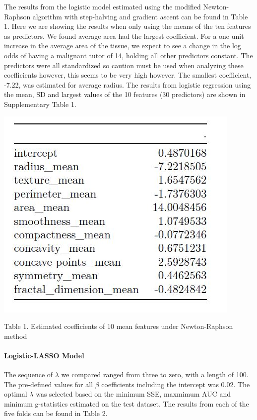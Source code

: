 \documentclass[]{article}
\let\oldparagraph\paragraph
\renewcommand{\paragraph}[1]{\oldparagraph{#1}\mbox{}}
\begin{document}
The results from the logistic model estimated using the modified
Newton-Raphson algorithm with step-halving and gradient ascent can be
found in Table 1. Here we are showing the results when only using the
means of the ten features as predictors. We found average area had the
largest coefficient. For a one unit increase in the average area of the
tissue, we expect to see a change in the log odds of having a malignant
tutor of 14, holding all other predictors constant. The predictors were
all standardized so caution must be used when analyzing these
coefficients however, this seems to be very high however. The smallest
coefficient, -7.22, was estimated for average radius. The results from
logistic regression using the mean, SD and largest values of the 10
features (30 predictors) are shown in Supplementary Table 1.

\begin{center}
\includegraphics{./results/NR.JPG}
\end{center}

\begin{center}
Table 1. Estimated coefficients of 10 mean features under Newton-Raphson method
\end{center}

\hypertarget{logistic-lasso-model}{%
\paragraph{Logistic-LASSO Model}\label{logistic-lasso-model}}

The sequence of \(\lambda\) we compared ranged from three to zero, with
a length of 100. The pre-defined values for all \(\beta\) coefficients
including the intercept was 0.02. The optimal \(\lambda\) was selected
based on the minimum SSE, maxmimum AUC and minimum g-statistics
estimated on the test dataset. The results from each of the five folds
can be found in Table 2.
\end{document}
